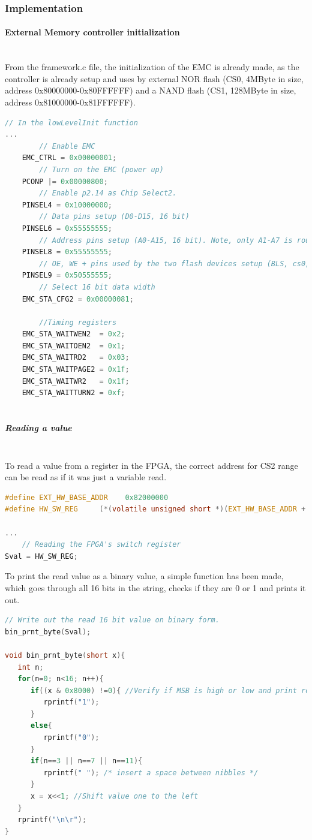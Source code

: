 \subsubsection{Implementation}

\paragraph{External Memory controller initialization}\textbf{ }\\
From the framework.c file, the initialization of the EMC is already made, as the controller is already setup and uses by external NOR flash (CS0, 4MByte in size, address 0x80000000-0x80FFFFFF) and a NAND flash (CS1, 128MByte in size, address 0x81000000-0x81FFFFFF).
\begin{lstlisting}[language=c]
// In the lowLevelInit function
...
		// Enable EMC
	EMC_CTRL = 0x00000001;
		// Turn on the EMC (power up)
	PCONP |= 0x00000800;
		// Enable p2.14 as Chip Select2.
	PINSEL4 = 0x10000000;
		// Data pins setup (D0-D15, 16 bit) 
	PINSEL6 = 0x55555555;
		// Address pins setup (A0-A15, 16 bit). Note, only A1-A7 is routed to the FPGA.
	PINSEL8 = 0x55555555;
		// OE, WE + pins used by the two flash devices setup (BLS, cs0, cs1, A16-A19).
	PINSEL9 = 0x50555555; 
		// Select 16 bit data width 
	EMC_STA_CFG2 = 0x00000081;
		
		//Timing registers
	EMC_STA_WAITWEN2  = 0x2;
	EMC_STA_WAITOEN2  = 0x1;
	EMC_STA_WAITRD2   = 0x03;
	EMC_STA_WAITPAGE2 = 0x1f;
	EMC_STA_WAITWR2   = 0x1f;
	EMC_STA_WAITTURN2 = 0xf;
	
\end{lstlisting}

\subparagraph{Reading a value}\textbf{ }\\
To read a value from a register in the FPGA, the correct address for CS2 range can be read as if it was just a variable read.
\begin{lstlisting}[language=c]
#define EXT_HW_BASE_ADDR	0x82000000
#define HW_SW_REG     (*(volatile unsigned short *)(EXT_HW_BASE_ADDR + 64))

...
	// Reading the FPGA's switch register
Sval = HW_SW_REG;
\end{lstlisting}
To print the read value as a binary value, a simple function has been made, which goes through all 16 bits in the string, checks if they are 0 or 1 and prints it out. 
\begin{lstlisting}[language=c]
	// Write out the read 16 bit value on binary form.
bin_prnt_byte(Sval);

void bin_prnt_byte(short x){
   int n;
   for(n=0; n<16; n++){
      if((x & 0x8000) !=0){	//Verify if MSB is high or low and print result
         rprintf("1");
      }
      else{
         rprintf("0");
      }
      if(n==3 || n==7 || n==11){
         rprintf(" "); /* insert a space between nibbles */
      }
      x = x<<1;	//Shift value one to the left
   }
   rprintf("\n\r");
}
\end{lstlisting}


